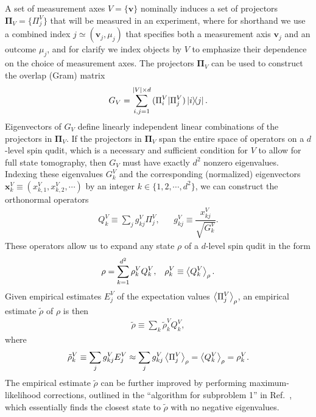 \documentclass[notitlepage,twocolumn]{revtex4-2}
\newcommand{\f}[2]{\dfrac{#1}{#2}} %
\newcommand{\p}[1]{\left(#1\right)} %
\renewcommand{\set}[1]{\{#1\}} %
\newcommand{\bk}{\Braket} %
\renewcommand{\v}{\bm} %
\newcommand{\1}{\mathds{1}}
\def\obk#1{\mathinner{({#1})}}
\begin{document}
A set of measurement axes $V=\set{\v v}$ nominally induces a set of projectors $\v\Pi_V=\set{\Pi_j^V}$ that will be measured in an experiment, where for shorthand we use a combined index $j\simeq\p{\v v_j,\mu_j}$ that specifies both a measurement axis $\v v_j$ and an outcome $\mu_j$, and for clarify we index objects by $V$ to emphasize their dependence on the choice of measurement axes.
The projectors $\v\Pi_V$ can be used to construct the overlap (Gram) matrix
\begin{align}
  G_V = \sum_{i,j=1}^{\abs{V}\times d} \obk{\Pi_i^V|\Pi_j^V} \op{i}{j}.
\end{align}
Eigenvectors of $G_V$ define linearly independent linear combinations of the projectors in $\v\Pi_V$.
If the projectors in $\v\Pi_V$ span the entire space of operators on a $d$-level spin qudit, which is a necessary and sufficient condition for $V$ to allow for full state tomography, then $G_V$ must have exactly $d^2$ nonzero eigenvalues.
Indexing these eigenvalues $G^V_k$ and the corresponding (normalized) eigenvectors $\v x^V_k\equiv(x^V_{k,1},x^V_{k,2},\cdots)$ by an integer $k\in\set{1,2,\cdots,d^2}$,
we can construct the orthonormal operators
\begin{align}
  Q^V_k \equiv \sum_j g^V_{kj} \Pi_j^V,
  &&
  g^V_{kj} \equiv \f{x^V_{kj}}{\sqrt{G^V_k}}.
\end{align}
These operators allow us to expand any state $\rho$ of a $d$-level spin qudit in the form
\begin{align}
  \rho = \sum_{k=1}^{d^2} \rho_k^V Q_k^V,
  &&
  \rho_k^V \equiv \bk{Q^V_k}_\rho.
\end{align}
Given empirical estimates $E_j^V$ of the expectation values $\bk{\Pi_j^V}_\rho$, an empirical estimate $\tilde\rho$ of $\rho$ is then
\begin{align}
  \tilde\rho \equiv \sum_k \tilde\rho^V_k Q^V_k,
\end{align}
where
\begin{align}
  \tilde\rho^V_k \equiv \sum_j g^V_{kj} E_j^V
  \approx \sum_j g^V_{kj} \bk{\Pi_j^V}_\rho
  = \bk{Q^V_k}_\rho
  = \rho^V_k.
\end{align}
The empirical estimate $\tilde\rho$ can be further improved by performing maximum-likelihood corrections, outlined in the ``algorithm for subproblem 1'' in Ref.~\cite{smolin2012efficient}, which essentially finds the closest state to $\tilde\rho$ with no negative eigenvalues.
\end{document}
